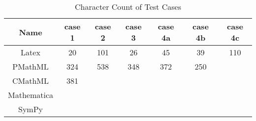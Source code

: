 \documentclass{article}
\begin{document}
\begin{center}
\begin{table}
\caption {Character Count of Test Cases} \label{table:char_count} 
\begin{center}
\begin{tabular}{|c|c|c|c|c|c|c|}\hline
Name            & case 1 & case 2 & case 3 & case 4a & case 4b & case 4c \\\hline
Latex            & 20       & 101     & 26       & 45         &   39      & 110 \\\hline
PMathML      &  324     & 538    & 348     & 372       &  250      &        \\\hline
CMathML      &   381    &           &            &             &              &        \\\hline
Mathematica &             &           &            &             &              &        \\\hline
SymPy           &             &           &            &             &              &        \\\hline
\end{tabular}
\end{center}
\end{table}
\end{center}
\end{document}
